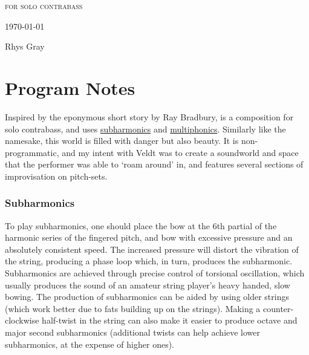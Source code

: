 
\invisiblechapter{\bassPiece}

\vspace{3.8cm}

\begin{center}

\textsc{for solo contrabass}

\vspace{2.8cm}

\HRule{0.5pt}

\LARGE \textbf{\uppercase{\bassPiece}}

\HRule{2pt}

\vspace{1.8cm}

\normalsize \today

\vspace{3.8cm}

Rhys Gray

\end{center}
\newpage

\section*{Program Notes}
Inspired by the eponymous short story by Ray Bradbury, \bassPiece \space is a composition for solo contrabass, and uses \hyperref[sec:subharmonics]{subharmonics} and \hyperref[sec:multiphonics]{multiphonics}. 
Similarly like the namesake, this world is filled with danger but also beauty. 
It is non-programmatic, and my intent with Veldt was to create a soundworld and space that the performer was able to `roam around' in, and features several sections of improvisation on pitch-sets.

\subsubsection*{Subharmonics}
To play subharmonics, one should place the bow at the 6th partial of the harmonic series of the fingered pitch, and bow with excessive pressure and an absolutely consistent speed. 
The increased pressure will distort the vibration of the string, producing a phase loop which, in turn, produces the subharmonic. 
Subharmonics are achieved through precise control of torsional oscillation, which usually produces the sound of an amateur string player's heavy handed, slow bowing. 
The production of subharmonics can be aided by using older strings (which work better due to fats building up on the strings). 
Making a counter-clockwise half-twist in the string can also make it easier to produce octave and major second subharmonics (additional twists can help achieve lower subharmonics, at the expense of higher ones).

